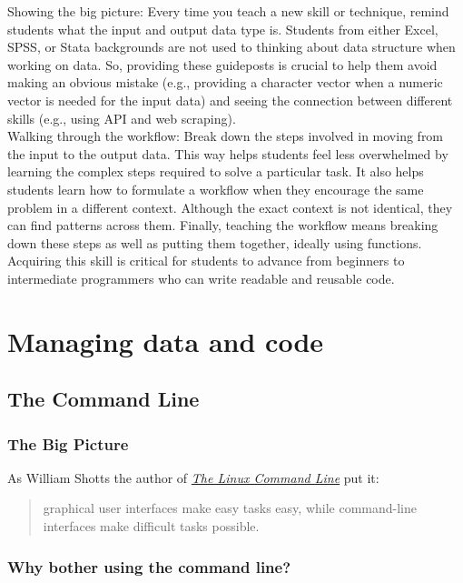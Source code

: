 \documentclass[
]{book}
\begin{document}
Showing the big picture: Every time you teach a new skill or technique, remind students what the input and output data type is. Students from either Excel, SPSS, or Stata backgrounds are not used to thinking about data structure when working on data. So, providing these guideposts is crucial to help them avoid making an obvious mistake (e.g., providing a character vector when a numeric vector is needed for the input data) and seeing the connection between different skills (e.g., using API and web scraping).\\
Walking through the workflow: Break down the steps involved in moving from the input to the output data. This way helps students feel less overwhelmed by learning the complex steps required to solve a particular task. It also helps students learn how to formulate a workflow when they encourage the same problem in a different context. Although the exact context is not identical, they can find patterns across them. Finally, teaching the workflow means breaking down these steps as well as putting them together, ideally using functions. Acquiring this skill is critical for students to advance from beginners to intermediate programmers who can write readable and reusable code.

\hypertarget{git_bash}{%
\chapter{Managing data and code}\label{git_bash}}

\hypertarget{the-command-line}{%
\section{The Command Line}\label{the-command-line}}

\hypertarget{the-big-picture}{%
\subsection{The Big Picture}\label{the-big-picture}}

As William Shotts the author of \emph{\href{http://linuxcommand.org/tlcl.php}{The Linux Command Line}} put it:

\begin{quote}
graphical user interfaces make easy tasks easy, while command-line interfaces make difficult tasks possible.
\end{quote}

\hypertarget{why-bother-using-the-command-line}{%
\subsection{Why bother using the command line?}\label{why-bother-using-the-command-line}}
\end{document}
